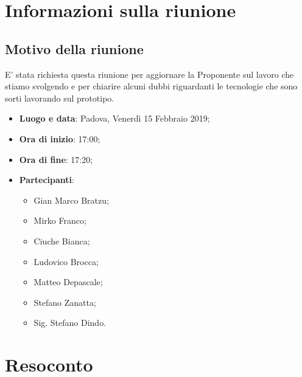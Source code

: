 \documentclass[a4paper,12pt]{article}
\begin{document}
	\tableofcontents
	\cleardoublepage
	\section{Informazioni sulla riunione}
	\subsection{Motivo della riunione}E' stata richiesta questa riunione per aggiornare la Proponente sul lavoro che stiamo svolgendo e per chiarire alcuni dubbi riguardanti le tecnologie che sono sorti lavorando sul prototipo.
	
	\begin{itemize}
		\item \textbf{Luogo e data}: Padova, Venerdì 15 Febbraio 2019;
		\item \textbf{Ora di inizio}: 17:00;
		\item \textbf{Ora di fine}: 17:20;
		\item \textbf{Partecipanti}:  
		\begin{itemize}
			\item Gian Marco Bratzu;
			\item Mirko Franco;
			\item Ciuche Bianca;
			\item Ludovico Brocca;
			\item Matteo Depascale;
			\item Stefano Zanatta;
			\item Sig. Stefano Dindo.
		\end{itemize}
	\end{itemize}
	
	
	\section{Resoconto}
\end{document}
